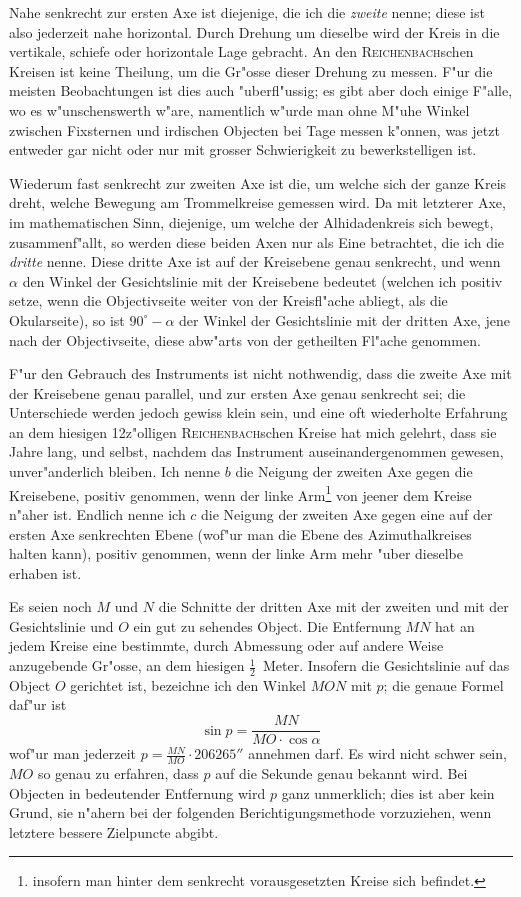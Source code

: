 \documentclass[12pt,a4paper]{article}
\begin{document}
Nahe senkrecht zur ersten Axe ist diejenige, die ich die \textit{zweite} nenne; diese ist also jederzeit nahe
horizontal. Durch Drehung um dieselbe wird der Kreis in die vertikale, schiefe oder horizontale Lage
gebracht. An den \textsc{Reichenbach}schen Kreisen ist keine Theilung, um die Gr"osse dieser Drehung zu
messen. F"ur die meisten Beobachtungen ist dies auch "uberfl"ussig; es gibt aber doch einige F"alle, wo es
w"unschenswerth w"are, namentlich w"urde man ohne M"uhe Winkel zwischen Fixsternen und irdischen
Objecten bei Tage messen k"onnen, was jetzt entweder gar nicht oder nur mit grosser Schwierigkeit zu
bewerkstelligen ist.

Wiederum fast senkrecht zur zweiten Axe ist die, um welche sich der ganze Kreis dreht, welche
Bewegung am Trommelkreise gemessen wird. Da mit letzterer Axe, im mathematischen Sinn, diejenige,
um welche der Alhidadenkreis sich bewegt, zusammenf"allt, so werden diese beiden Axen nur als Eine
betrachtet, die ich die \textit{dritte} nenne. Diese dritte Axe ist auf der Kreisebene genau senkrecht, und wenn
$\alpha$ den Winkel der Gesichtslinie mit der Kreisebene bedeutet (welchen ich positiv setze, wenn die Objectivseite
weiter von der Kreisfl"ache abliegt, als die Okularseite), so ist $90^{\circ} - \alpha$ der Winkel der Gesichtslinie mit der
dritten Axe, jene nach der Objectivseite, diese abw"arts von der getheilten Fl"ache genommen.

F"ur den Gebrauch des Instruments ist nicht nothwendig, dass die zweite Axe mit der Kreisebene
genau parallel, und zur ersten Axe genau senkrecht sei; die Unterschiede werden jedoch gewiss klein sein,
und eine oft wiederholte Erfahrung an dem hiesigen 12z"olligen \textsc{Reichenbach}schen Kreise hat mich gelehrt,
dass sie Jahre lang, und selbst, nachdem das Instrument auseinandergenommen gewesen, unver"anderlich
bleiben. Ich nenne $b$ die Neigung der zweiten Axe gegen die Kreisebene, positiv genommen, wenn der
linke Arm\footnote{insofern man hinter dem senkrecht vorausgesetzten Kreise sich befindet.} von jeener dem
Kreise n"aher ist. Endlich nenne ich $c$ die Neigung der zweiten Axe gegen eine auf der ersten Axe
senkrechten Ebene (wof"ur man die Ebene des Azimuthalkreises halten kann), positiv genommen, wenn der
linke Arm mehr "uber dieselbe erhaben ist.

Es seien noch $M$ und $N$ die Schnitte der dritten Axe mit der zweiten und mit der Gesichtslinie
und $O$ ein gut zu sehendes Object. Die Entfernung $MN$ hat an jedem Kreise eine bestimmte, durch
Abmessung oder auf andere Weise anzugebende Gr"osse, an dem hiesigen $\frac{1}{2}$~Meter. Insofern die Gesichtslinie
auf das Object $O$ gerichtet ist, bezeichne ich den Winkel $MON$ mit $p$; die genaue Formel daf"ur ist
\[\sin p = \frac{MN}{MO \cdot \cos\alpha}\]
wof"ur man jederzeit $p = \frac{MN}{MO} \cdot 206265''$ annehmen darf. Es wird nicht schwer sein, $MO$ so genau zu
erfahren, dass $p$ auf die Sekunde genau bekannt wird. Bei Objecten in bedeutender Entfernung wird
$p$ ganz unmerklich; dies ist aber kein Grund, sie n"ahern bei der folgenden Berichtigungsmethode vorzuziehen,
wenn letztere bessere Zielpuncte abgibt.
\end{document}
